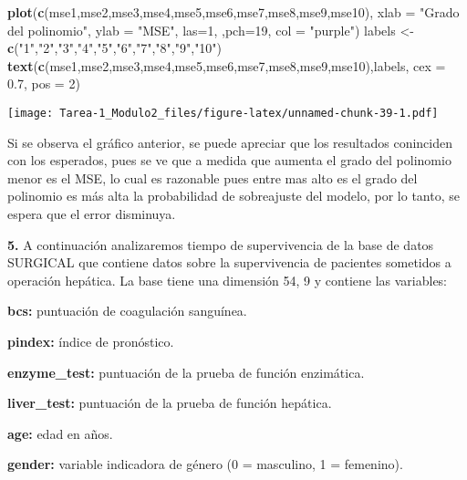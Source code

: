 \documentclass[
]{article}
\newenvironment{Shaded}{\begin{snugshade}}{\end{snugshade}}
\newcommand{\DataTypeTok}[1]{\textcolor[rgb]{0.13,0.29,0.53}{#1}}
\newcommand{\DecValTok}[1]{\textcolor[rgb]{0.00,0.00,0.81}{#1}}
\newcommand{\FloatTok}[1]{\textcolor[rgb]{0.00,0.00,0.81}{#1}}
\newcommand{\KeywordTok}[1]{\textcolor[rgb]{0.13,0.29,0.53}{\textbf{#1}}}
\newcommand{\NormalTok}[1]{#1}
\newcommand{\StringTok}[1]{\textcolor[rgb]{0.31,0.60,0.02}{#1}}
\begin{document}
\begin{Shaded}
\begin{Highlighting}[]
\KeywordTok{plot}\NormalTok{(}\KeywordTok{c}\NormalTok{(mse1,mse2,mse3,mse4,mse5,mse6,mse7,mse8,mse9,mse10),}
     \DataTypeTok{xlab =} \StringTok{"Grado del polinomio"}\NormalTok{, }\DataTypeTok{ylab =} \StringTok{"MSE"}\NormalTok{, }\DataTypeTok{las=}\DecValTok{1}\NormalTok{,}
\NormalTok{     ,}\DataTypeTok{pch=}\DecValTok{19}\NormalTok{,}
     \DataTypeTok{col =} \StringTok{"purple"}\NormalTok{)}
\NormalTok{labels <-}\StringTok{ }\KeywordTok{c}\NormalTok{(}\StringTok{"1"}\NormalTok{,}\StringTok{"2"}\NormalTok{,}\StringTok{"3"}\NormalTok{,}\StringTok{"4"}\NormalTok{,}\StringTok{"5"}\NormalTok{,}\StringTok{"6"}\NormalTok{,}\StringTok{"7"}\NormalTok{,}\StringTok{"8"}\NormalTok{,}\StringTok{"9"}\NormalTok{,}\StringTok{"10"}\NormalTok{)}
\KeywordTok{text}\NormalTok{(}\KeywordTok{c}\NormalTok{(mse1,mse2,mse3,mse4,mse5,mse6,mse7,mse8,mse9,mse10),labels,}
     \DataTypeTok{cex =} \FloatTok{0.7}\NormalTok{, }\DataTypeTok{pos =} \DecValTok{2}\NormalTok{)}
\end{Highlighting}
\end{Shaded}

\texttt{[image: Tarea-1\_Modulo2\_files/figure-latex/unnamed-chunk-39-1.pdf]}

Si se observa el gráfico anterior, se puede apreciar que los resultados
coninciden con los esperados, pues se ve que a medida que aumenta el
grado del polinomio menor es el MSE, lo cual es razonable pues entre mas
alto es el grado del polinomio es más alta la probabilidad de
sobreajuste del modelo, por lo tanto, se espera que el error disminuya.

\textbf{5.} A continuación analizaremos tiempo de supervivencia de la
base de datos SURGICAL que contiene datos sobre la supervivencia de
pacientes sometidos a operación hepática. La base tiene una dimensión
54, 9 y contiene las variables:

\textbf{bcs:} puntuación de coagulación sanguínea.

\textbf{pindex:} índice de pronóstico.

\textbf{enzyme\_test:} puntuación de la prueba de función enzimática.

\textbf{liver\_test:} puntuación de la prueba de función hepática.

\textbf{age:} edad en años.

\textbf{gender:} variable indicadora de género (0 = masculino, 1 =
femenino).
\end{document}
